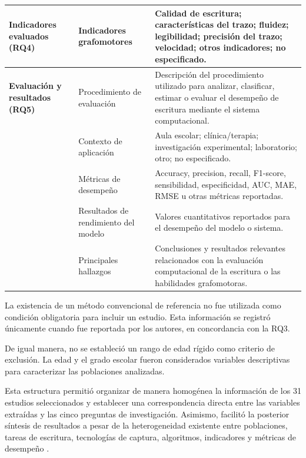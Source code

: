 \documentclass{iaesarticle}
\begin{document}
\begin{longtable}{%
    |>{\raggedright\arraybackslash}p{}%
    |>{\raggedright\arraybackslash}p{}%
    |>{\raggedright\arraybackslash}p{}|}
\textbf{Indicadores evaluados (RQ4)}
&
Indicadores grafomotores
&
Calidad de escritura; características del trazo; fluidez; legibilidad; precisión del trazo; velocidad; otros indicadores; no especificado.
\\

\hline


\textbf{Evaluación y resultados (RQ5)}
&
Procedimiento de evaluación
&
Descripción del procedimiento utilizado para analizar, clasificar, estimar o evaluar el desempeño de escritura mediante el sistema computacional.
\\

\addlinespace[2mm]

&
Contexto de aplicación
&
Aula escolar; clínica/terapia; investigación experimental; laboratorio; otro; no especificado.
\\

\addlinespace[2mm]

&
Métricas de desempeño
&
Accuracy, precision, recall, F1-score, sensibilidad, especificidad, AUC, MAE, RMSE u otras métricas reportadas.
\\

\addlinespace[2mm]

&
Resultados de rendimiento del modelo
&
Valores cuantitativos reportados para el desempeño del modelo o sistema.
\\

\addlinespace[2mm]

&
Principales hallazgos
&
Conclusiones y resultados relevantes relacionados con la evaluación computacional de la escritura o las habilidades grafomotoras.
\\

\hline

\end{longtable}

La existencia de un método convencional de referencia no fue utilizada como condición obligatoria para incluir un estudio. Esta información se registró únicamente cuando fue reportada por los autores, en concordancia con la RQ3.

De igual manera, no se estableció un rango de edad rígido como criterio de exclusión. La edad y el grado escolar fueron considerados variables descriptivas para caracterizar las poblaciones analizadas.

Esta estructura permitió organizar de manera homogénea la información de los 31 estudios seleccionados y establecer una correspondencia directa entre las variables extraídas y las cinco preguntas de investigación. Asimismo, facilitó la posterior síntesis de resultados a pesar de la heterogeneidad existente entre poblaciones, tareas de escritura, tecnologías de captura, algoritmos, indicadores y métricas de desempeño \cite{cruzes2011}.
\end{document}
